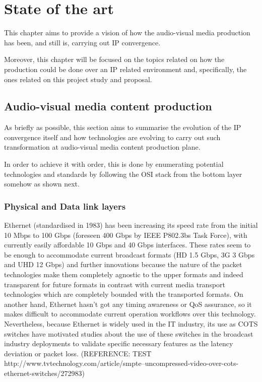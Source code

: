 \chapter{State of the art}\label{A:stateOfTheArt}

This chapter aims to provide a vision of how the audio-visual media production has been, and still is, carrying out IP convergence. 

Moreover, this chapter will be focused on the topics related on how the production could be done over an IP related environment and, specifically, the ones related on this project study and proposal.


\section{Audio-visual media content production}

As briefly as possible, this section aims to summarise the evolution of the IP convergence itself and how technologies are evolving to carry out such transformation at audio-visual media content production plane.

In order to achieve it with order, this is done by enumerating potential technologies and standards by following the OSI stack from the bottom layer somehow as shown next.

\subsection{Physical and Data link layers}

Ethernet (standardised in 1983) has been increasing its speed rate from the initial 10 Mbps to 100 Gbps (foreseen 400 Gbps by IEEE P802.3bs Task Force), with currently easily affordable 10 Gbps and 40 Gbps interfaces. These rates seem to be enough to accommodate current broadcast formats (HD 1.5 Gbps,
3G 3 Gbps and UHD 12 Gbps) and further innovations because the nature of the packet technologies
make them completely agnostic to the upper formats and indeed transparent for future formats in
contrast with current media transport technologies which are completely bounded with the transported
formats. On another hand, Ethernet hasn't got any timing awareness or QoS assurance, so it makes
difficult to accommodate current operation workflows over this technology. Nevertheless, because
Ethernet is widely used in the IT industry, its use as COTS switches have motivated studies about the
use of these switches in the broadcast industry deployments to validate specific necessary
features as the latency deviation or packet loss. (REFERENCE: TEST http://www.tvtechnology.com/article/smpte--uncompressed-video-over-cots-ethernet-switches/272983)

